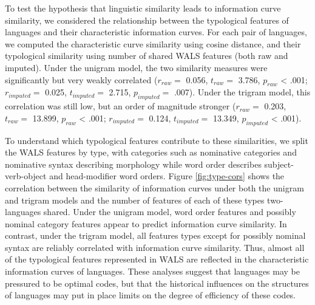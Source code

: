 \documentclass[entropy,article,submit,moreauthors,pdftex]{mdpi}
\begin{document}
To test the hypothesis that linguistic similarity leads to information
curve similarity, we considered the relationship between the typological
features of languages and their characteristic information curves. For
each pair of languages, we computed the characteristic curve similarity
using cosine distance, and their typological similarity using number of
shared WALS features (both raw and imputed). Under the unigram model,
the two similarity measures were significantly but very weakly
correlated (\(r_{raw} =\) 0.056, \(t_{raw} =\) 3.786, \(p_{raw}\)
\textless{} .001; \(r_{imputed} =\) 0.025, \(t_{imputed} =\) 2.715,
\(p_{imputed} =\) .007). Under the trigram model, this correlation was
still low, but an order of magnitude stronger (\(r_{raw} =\) 0.203,
\(t_{raw} =\) 13.899, \(p_{raw}\) \textless{} .001; \(r_{imputed} =\)
0.124, \(t_{imputed} =\) 13.349, \(p_{imputed}\) \textless{} .001).

To understand which typological features contribute to these
similarities, we split the WALS features by type, with categories such
as nominative categories and nominative syntax describing morphology
while word order describes subject-verb-object and head-modifier word
orders. Figure \ref{fig:type-cors} shows the correlation between the
similarity of information curves under both the unigram and trigram
models and the number of features of each of these types two-languages
shared. Under the unigram model, word order features and possibly
nominal category features appear to predict information curve
similarity. In contrast, under the trigram model, all features types
except for possibly nominal syntax are reliably correlated with
information curve similarity. Thus, almost all of the typological
features represented in WALS are reflected in the characteristic
information curves of languages. These analyses suggest that languages
may be pressured to be optimal codes, but that the historical influences
on the structures of languages may put in place limits on the degree of
efficiency of these codes.
\end{document}

